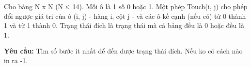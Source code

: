 Cho bảng N x N (N ≤ 14). Mỗi ô là 1 số 0 hoặc 1. Một phép Touch(i, j) cho phép đổi ngược giá trị của ô (i, j) - hàng i, cột j - và các ô kề cạnh (nếu có) từ 0 thành 1 và từ 1 thành 0. Trạng thái đích là trạng thái mà cả bảng đều là 0 hoặc đều là 1.  

\textbf{    Yêu cầu:   }   Tìm số bước ít nhất để đến được trạng thái đích. Nếu ko có cách nào in ra -1.